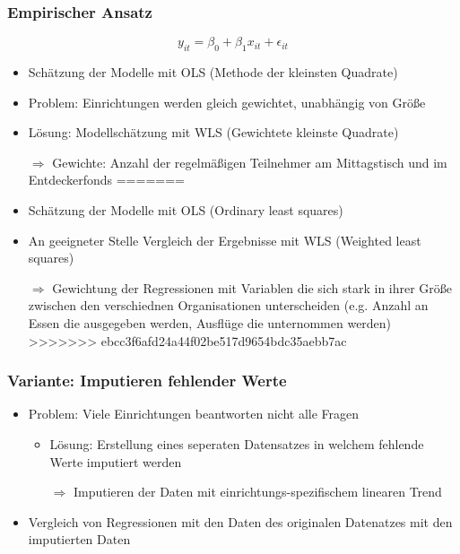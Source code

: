 \begin{frame}
\frametitle{Empirischer Ansatz}

\begin{equation}
\label{SimpleLinearModel}
  y_{it} = \beta_0 + \beta_1 x_{it} + \epsilon_{it}
\end{equation}

\begin{itemize}
<<<<<<< HEAD
\item Schätzung der Modelle mit OLS (Methode der kleinsten Quadrate)
\item Problem: Einrichtungen werden gleich gewichtet, unabhängig von Größe
\item Lösung: Modellschätzung mit WLS (Gewichtete kleinste Quadrate)
\item [$\Rightarrow$] Gewichte: Anzahl der regelmäßigen Teilnehmer am Mittagstisch und im Entdeckerfonds
=======
\item Schätzung der Modelle mit OLS (Ordinary least squares)
\item An geeigneter Stelle Vergleich der Ergebnisse mit WLS (Weighted least squares) \item[$\Rightarrow$]Gewichtung der Regressionen mit Variablen die sich stark in ihrer Größe zwischen den verschiednen Organisationen unterscheiden (e.g. Anzahl an Essen die ausgegeben werden, Ausflüge die unternommen werden)
>>>>>>> ebcc3f6afd24a44f02be517d9654bdc35aebb7ac
\end{itemize}

\end{frame}

\begin{frame}[fragile]
\frametitle{Variante: Imputieren fehlender Werte}
\begin{itemize}
\item Problem: Viele Einrichtungen beantworten nicht alle Fragen
\begin{itemize}
\item Lösung: Erstellung eines seperaten Datensatzes in welchem fehlende Werte imputiert werden
\item [$\Rightarrow$] Imputieren der Daten mit einrichtungs-spezifischem linearen Trend
\end{itemize}
\item Vergleich von Regressionen mit den Daten des originalen Datenatzes mit den imputierten Daten
\end{itemize}
\end{frame}


